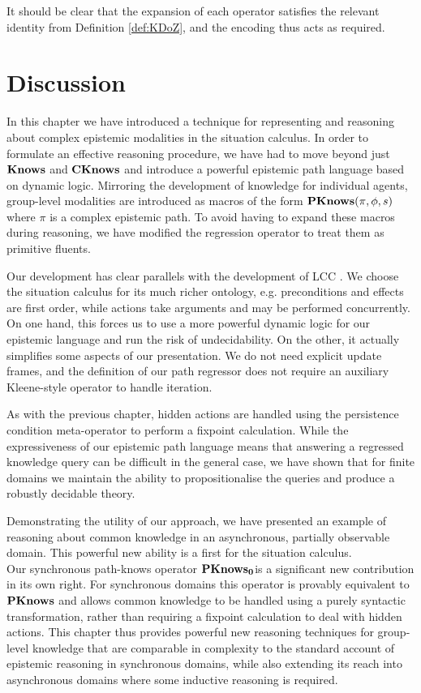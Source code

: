 It should be clear that the expansion of each operator satisfies the
relevant identity from Definition \ref{def:KDoZ}, and the encoding
thus acts as required.


\section{Discussion\label{sec:CKnowledge:Discussion}}

In this chapter we have introduced a technique for representing and
reasoning about complex epistemic modalities in the situation calculus.
In order to formulate an effective reasoning procedure, we have had
to move beyond just $\mathbf{Knows}$ and $\mathbf{CKnows}$ and introduce a powerful
epistemic path language based on dynamic logic. Mirroring the development
of knowledge for individual agents, group-level modalities are introduced
as macros of the form $\mathbf{PKnows}(\pi,\phi,s)$ where $\pi$ is a complex
epistemic path. To avoid having to expand these macros during reasoning,
we have modified the regression operator to treat them as primitive
fluents.

Our development has clear parallels with the development of LCC \citep{vanBenthem06lcc}.
We choose the situation calculus for its much richer ontology, e.g.
preconditions and effects are first order, while actions take arguments
and may be performed concurrently. On one hand, this forces us to
use a more powerful dynamic logic for our epistemic language and run
the risk of undecidability. On the other, it actually simplifies some
aspects of our presentation. We do not need explicit update frames,
and the definition of our path regressor does not require an auxiliary
Kleene-style operator to handle iteration.

As with the previous chapter, hidden actions are handled using the
persistence condition meta-operator to perform a fixpoint calculation.
While the expressiveness of our epistemic path language means that
answering a regressed knowledge query can be difficult in the general
case, we have shown that for finite domains we maintain the ability
to propositionalise the queries and produce a robustly decidable theory.

Demonstrating the utility of our approach, we have presented an example
of reasoning about common knowledge in an asynchronous, partially
observable domain. This powerful new ability is a first for the situation
calculus.\\


Our synchronous path-knows operator $\mathbf{PKnows_{0}}$is a significant new
contribution in its own right. For synchronous domains this operator
is provably equivalent to $\mathbf{PKnows}$ and allows common knowledge to
be handled using a purely syntactic transformation, rather than requiring
a fixpoint calculation to deal with hidden actions. This chapter thus
provides powerful new reasoning techniques for group-level knowledge
that are comparable in complexity to the standard account of epistemic
reasoning in synchronous domains, while also extending its reach into
asynchronous domains where some inductive reasoning is required. \\


